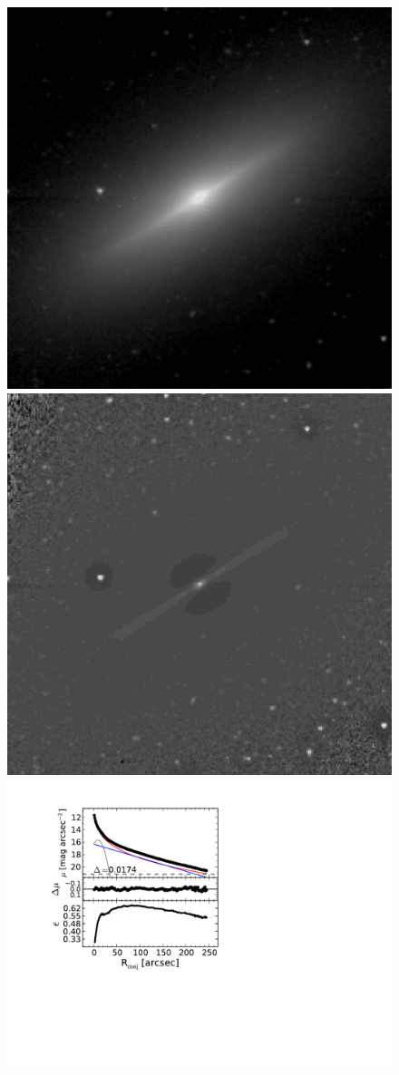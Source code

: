 \documentclass[useAMS,usenatbib,article]{mn2e}
\begin{document}
\begin{figure}
\begin{center}
\includegraphics[width=0.49\columnwidth]{images/n3115_image.jpeg}
\includegraphics[width=0.49\columnwidth]{images/n3115_unsharp.jpeg} \\
\includegraphics[width=1.05\columnwidth]{images/n3115_decomposition.pdf}
\caption{}
\label{fig:n3115}
\end{center}
\end{figure}
\end{document}
